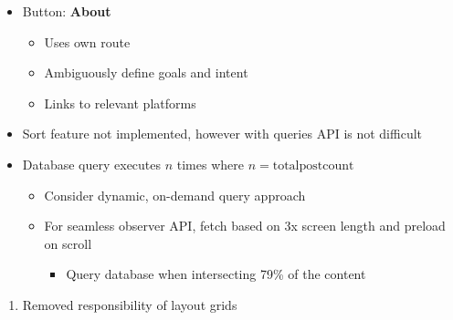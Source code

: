 \documentclass[7px]{article}
\begin{document}
{\begin{itemize}[label=\textsection]
\begin{itemize}[label=$\multimapdotinv$, leftmargin=3mm]
          \footnotesize{
            \begin{itemize}[label=$\multimapinv$]
              \item Transform to: \textbf{Categories}
                \begin{itemize}
                  \item Shows a succinct list of categories and post count
                  \item Use a separate route which nests category routes spreading relevant pages
                \end{itemize}
            \end{itemize}
          }
          \small
        \item Button: \textbf{About}
          \footnotesize{
            \begin{itemize}[label=$\multimapinv$]
              \item Uses own route
              \item Ambiguously define goals and intent
              \item Links to relevant platforms
            \end{itemize}
          }
          \small
      \end{itemize}
  \end{itemize}
}
{
  \raggedright
  \begin{itemize}[label=\blitzb]
    \small
    \item Sort feature not implemented, however with queries API is not difficult
    \item Database query executes $n$ times where $n = \text{total}$\hspace{0.7mm}$\text{post}$\hspace{0.7mm}$\text{count}$
      \footnotesize
      \begin{itemize}[label=$\multimapinv$]
        \item Consider dynamic, on-demand query approach
        \item For seamless {\cap} observer API, fetch based on 3x screen length and preload on scroll
          \begin{itemize}[label=$\multimapinv$]
            \item Query database when intersecting 79\% of the content
          \end{itemize}
      \end{itemize}
      \small
  \end{itemize}
}

\deploy
{
  \begin{enumerate}
    \item Removed responsibility of layout grids
  \end{enumerate}
}
\end{document}
